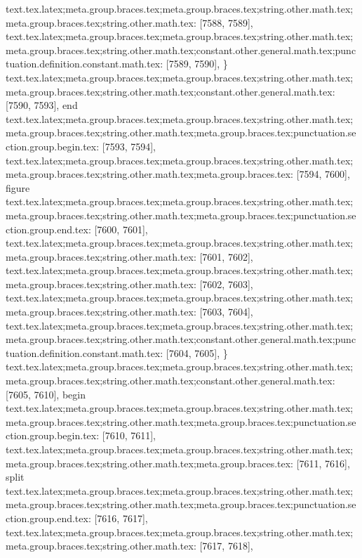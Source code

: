 {{{{{{{{{{{{{{{{{{{{{{{{{{{{{{{{{{{{{{{{{{{{{{{{{{{{{{{{{{{{{{{{{{{{{{{{{{{{{{{{{{{{{{{{{{{{{{{{{{{{{{{{{{{{{{{{{{{{{{{{{{{{{{{{{{{{{{{{{{{{{{{{{{{{{{{{{{{{{{{{{{{{{{{{{{{{{{{{{{{{{{{{{{{{{{{{{{{{{{{{{{{{{{{{text.tex.latex;meta.group.braces.tex;meta.group.braces.tex;string.other.math.tex;meta.group.braces.tex;string.other.math.tex: [7588, 7589], {
}
text.tex.latex;meta.group.braces.tex;meta.group.braces.tex;string.other.math.tex;meta.group.braces.tex;string.other.math.tex;constant.other.general.math.tex;punctuation.definition.constant.math.tex: [7589, 7590], {\}
text.tex.latex;meta.group.braces.tex;meta.group.braces.tex;string.other.math.tex;meta.group.braces.tex;string.other.math.tex;constant.other.general.math.tex: [7590, 7593], {end}
text.tex.latex;meta.group.braces.tex;meta.group.braces.tex;string.other.math.tex;meta.group.braces.tex;string.other.math.tex;meta.group.braces.tex;punctuation.section.group.begin.tex: [7593, 7594], {{}
text.tex.latex;meta.group.braces.tex;meta.group.braces.tex;string.other.math.tex;meta.group.braces.tex;string.other.math.tex;meta.group.braces.tex: [7594, 7600], {figure}
text.tex.latex;meta.group.braces.tex;meta.group.braces.tex;string.other.math.tex;meta.group.braces.tex;string.other.math.tex;meta.group.braces.tex;punctuation.section.group.end.tex: [7600, 7601], {}}
text.tex.latex;meta.group.braces.tex;meta.group.braces.tex;string.other.math.tex;meta.group.braces.tex;string.other.math.tex: [7601, 7602], {
}
text.tex.latex;meta.group.braces.tex;meta.group.braces.tex;string.other.math.tex;meta.group.braces.tex;string.other.math.tex: [7602, 7603], {
}
text.tex.latex;meta.group.braces.tex;meta.group.braces.tex;string.other.math.tex;meta.group.braces.tex;string.other.math.tex: [7603, 7604], {
}
text.tex.latex;meta.group.braces.tex;meta.group.braces.tex;string.other.math.tex;meta.group.braces.tex;string.other.math.tex;constant.other.general.math.tex;punctuation.definition.constant.math.tex: [7604, 7605], {\}
text.tex.latex;meta.group.braces.tex;meta.group.braces.tex;string.other.math.tex;meta.group.braces.tex;string.other.math.tex;constant.other.general.math.tex: [7605, 7610], {begin}
text.tex.latex;meta.group.braces.tex;meta.group.braces.tex;string.other.math.tex;meta.group.braces.tex;string.other.math.tex;meta.group.braces.tex;punctuation.section.group.begin.tex: [7610, 7611], {{}
text.tex.latex;meta.group.braces.tex;meta.group.braces.tex;string.other.math.tex;meta.group.braces.tex;string.other.math.tex;meta.group.braces.tex: [7611, 7616], {split}
text.tex.latex;meta.group.braces.tex;meta.group.braces.tex;string.other.math.tex;meta.group.braces.tex;string.other.math.tex;meta.group.braces.tex;punctuation.section.group.end.tex: [7616, 7617], {}}
text.tex.latex;meta.group.braces.tex;meta.group.braces.tex;string.other.math.tex;meta.group.braces.tex;string.other.math.tex: [7617, 7618], {
}}}}}}}}}}}}}}}}}}}}}}}}}}}}}}}}}}}}}}}}}}}}}}}}}}}}}}}}}}}}}}}}}}}}}}}}}}}}}}}}}}}}}}}}}}}}}}}}}}}}}}}}}}}}}}}}}}}}}}}}}}}}}}}}}}}}}}}}}}}}}}}}}}}}}}}}}}}}}}}}}}}}}}}}}}}}}}}}}}}}}}}}}}}}}}}}}}}}}}}}}}}}}}}}}}}
